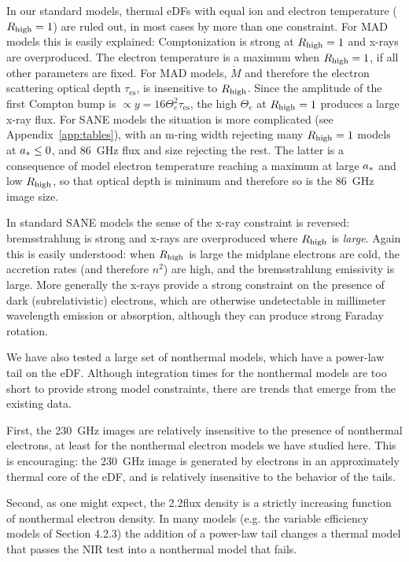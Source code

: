 In our standard models, thermal eDFs with equal ion and electron temperature ($R_\mathrm{high} = 1$) are ruled out, in most cases by more than one constraint.  For MAD models this is easily explained: Comptonization is strong at $R_\mathrm{high} = 1$ and x-rays are overproduced.  The electron temperature is a maximum when $R_\mathrm{high} = 1$, if all other parameters are fixed. For MAD models, $\dot{M}$ and therefore the electron scattering optical depth $\tau_\mathrm{es}$, is insensitive to $R_\mathrm{high}$.  Since the amplitude of the first Compton bump is $\propto y = 16 \Theta_e^2 \tau_\mathrm{es}$, the high $\Theta_e$ at $R_\mathrm{high} = 1$ produces a large x-ray flux.  For SANE models the situation is more complicated (see Appendix~\ref{app:tables}), with an m-ring width rejecting many $R_\mathrm{high} = 1$ models at $a_* \le 0$, and 86~GHz flux and size rejecting the rest.  The latter is a consequence of model electron temperature reaching a maximum at large $a_*$ and low $R_\mathrm{high}$, so that optical depth is minimum and therefore so is the 86~GHz image size.

In standard SANE models the sense of the x-ray constraint is reversed: bremsstrahlung is strong and x-rays are overproduced where $R_\mathrm{high}$ is {\em large}.  Again this is easily understood: when $R_\mathrm{high}$ is large the midplane electrons are cold, the accretion rates (and therefore $n^2$) are high, and the bremsstrahlung emissivity is large.  More generally the x-rays provide a strong constraint on the presence of dark (subrelativistic) electrons, which are otherwise undetectable in millimeter wavelength emission or absorption, although they can produce strong Faraday rotation.

We have also tested a large set of nonthermal models, which have a power-law tail on the eDF.  Although integration times for the nonthermal models are too short to provide strong model constraints, there are trends that emerge from the existing data.

First, the 230~GHz images are relatively insensitive to the presence of nonthermal electrons, at least for the nonthermal electron models we have studied here.  This is encouraging: the 230~GHz image is generated by electrons in an approximately thermal core of the eDF, and is relatively insensitive to the behavior of the tails.

Second, as one might expect, the 2.2\um flux density is a strictly increasing function of nonthermal electron density.  In many models (e.g. the variable efficiency models of Section 4.2.3) the addition of a power-law tail changes a thermal model that passes the NIR test into a nonthermal model that fails.


